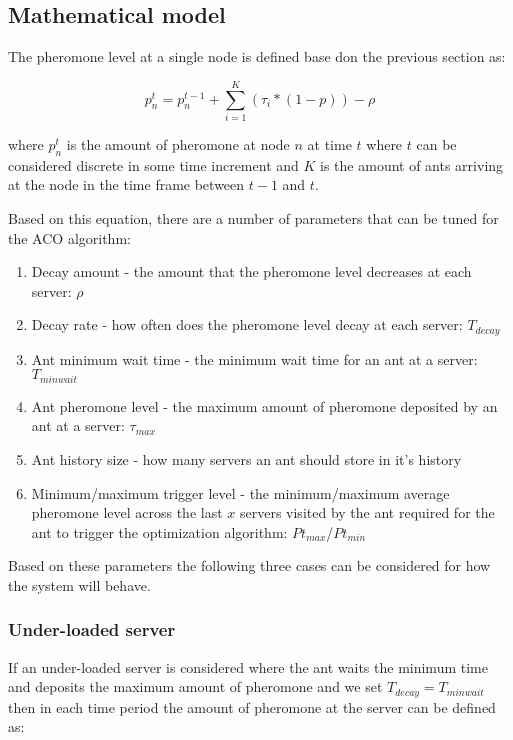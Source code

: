 \subsection{Mathematical model}

The pheromone level at a single node is defined base don the previous section as:

\begin{equation}
p^{t}_{n} = p^{t-1}_{n} + \sum_{i=1}^{K}(\tau_{i} * (1 - p)) - \rho
\end{equation}

where $p^{t}_{n}$ is the amount of pheromone at node $n$ at time $t$ where $t$ can be considered discrete in some time increment and $K$ is the amount of ants arriving at the node in the time frame between $t-1$ and $t$.

Based on this equation, there are a number of parameters that can be tuned for the ACO algorithm:

\begin{enumerate}
	\item Decay amount - the amount that the pheromone level decreases at each server: $\rho$
	\item Decay rate - how often does the pheromone level decay at each server: $T_{decay}$
	\item Ant minimum wait time - the minimum wait time for an ant at a server: $T_{minwait}$
	\item Ant pheromone level - the maximum amount of pheromone deposited by an ant at a server: $\tau_{max}$
	\item Ant history size - how many servers an ant should store in it's history
	\item Minimum/maximum trigger level - the minimum/maximum average pheromone level across the last $x$ servers visited by the ant required for the ant to trigger the optimization algorithm: $Pt_{max}$/$Pt_{min}$
\end{enumerate}

Based on these parameters the following three cases can be considered for how the system will behave.

\subsubsection{Under-loaded server}

If an under-loaded server is considered where the ant waits the minimum time and deposits the maximum amount of pheromone and we set $T_{decay} = T_{minwait}$ then in each time period the amount of pheromone at the server can be defined as:

